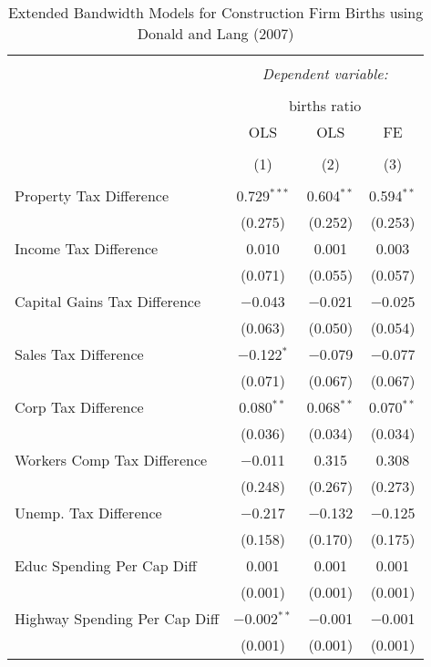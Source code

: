 
\begin{table}[!htbp] \centering 
  \caption{Extended Bandwidth Models for  Construction Firm Births using Donald and Lang (2007)} 
  \label{} 
\begin{tabular}{@{\extracolsep{5pt}}lccc} 
\\[-1.8ex]\hline 
\hline \\[-1.8ex] 
 & \multicolumn{3}{c}{\textit{Dependent variable:}} \\ 
\cline{2-4} 
\\[-1.8ex] & \multicolumn{3}{c}{births ratio} \\ 
 & OLS & OLS & FE \\ 
\\[-1.8ex] & (1) & (2) & (3)\\ 
\hline \\[-1.8ex] 
 Property Tax Difference & 0.729$^{***}$ & 0.604$^{**}$ & 0.594$^{**}$ \\ 
  & (0.275) & (0.252) & (0.253) \\ 
  Income Tax Difference & 0.010 & 0.001 & 0.003 \\ 
  & (0.071) & (0.055) & (0.057) \\ 
  Capital Gains Tax Difference & $-$0.043 & $-$0.021 & $-$0.025 \\ 
  & (0.063) & (0.050) & (0.054) \\ 
  Sales Tax Difference & $-$0.122$^{*}$ & $-$0.079 & $-$0.077 \\ 
  & (0.071) & (0.067) & (0.067) \\ 
  Corp Tax Difference & 0.080$^{**}$ & 0.068$^{**}$ & 0.070$^{**}$ \\ 
  & (0.036) & (0.034) & (0.034) \\ 
  Workers Comp Tax Difference & $-$0.011 & 0.315 & 0.308 \\ 
  & (0.248) & (0.267) & (0.273) \\ 
  Unemp. Tax Difference & $-$0.217 & $-$0.132 & $-$0.125 \\ 
  & (0.158) & (0.170) & (0.175) \\ 
  Educ Spending Per Cap Diff & 0.001 & 0.001 & 0.001 \\ 
  & (0.001) & (0.001) & (0.001) \\ 
  Highway Spending Per Cap Diff & $-$0.002$^{**}$ & $-$0.001 & $-$0.001 \\ 
  & (0.001) & (0.001) & (0.001) \\ 

\end{tabular}
\end{table}

